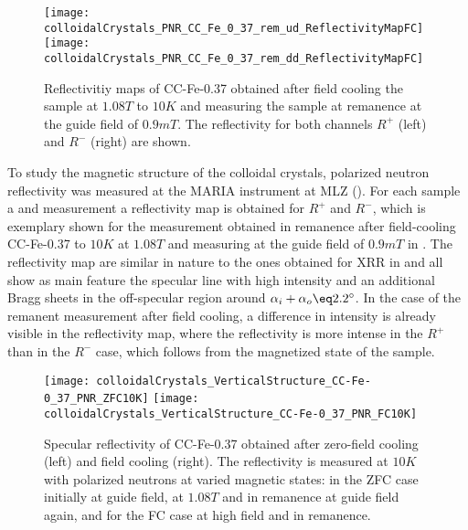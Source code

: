\documentclass[\main/dresen_thesis.tex]{subfiles}
\begin{document}
  \label{sec:colloidalCrystals:layers:pnr}

  \begin{figure}[tb]
    \centering
    \texttt{[image: colloidalCrystals\_PNR\_CC\_Fe\_0\_37\_rem\_ud\_ReflectivityMapFC]}
    \texttt{[image: colloidalCrystals\_PNR\_CC\_Fe\_0\_37\_rem\_dd\_ReflectivityMapFC]}
    \caption{\label{fig:colloidalCrystals:pnrRemanenceMaps} Reflectivitiy maps of CC-Fe-0.37 obtained after field cooling the sample at $1.08 \unit{T}$ to $10 \unit{K}$ and measuring the sample at remanence at the guide field of $0.9 \unit{mT}$. The reflectivity for both channels $R^{+}$ (left) and $R^{-}$ (right) are shown.}
  \end{figure}

  To study the magnetic structure of the colloidal crystals, polarized neutron reflectivity was measured at the MARIA instrument at MLZ ().
  For each sample a and measurement a reflectivity map is obtained for $R^{+}$ and $R^{-}$, which is exemplary shown for the measurement obtained in remanence after field-cooling CC-Fe-0.37 to $10 \unit{K}$ at $1.08\unit{T}$ and measuring at the guide field of $0.9 \unit{mT}$ in .
  The reflectivity map are similar in nature to the ones obtained for XRR in  and all show as main feature the specular line with high intensity and an additional Bragg sheets in the off-specular region around $\alpha_i + \alpha_o \eq 2.2^\circ$.
  In the case of the remanent measurement after field cooling, a difference in intensity is already visible in the reflectivity map, where the reflectivity is more intense in the $R^{+}$ than in the $R^{-}$ case, which follows from the magnetized state of the sample.

  \begin{figure}[tb]
    \centering
    \texttt{[image: colloidalCrystals\_VerticalStructure\_CC-Fe-0\_37\_PNR\_ZFC10K]}
    \texttt{[image: colloidalCrystals\_VerticalStructure\_CC-Fe-0\_37\_PNR\_FC10K]}
    \caption{\label{fig:colloidalCrystals:pnrCCFe37}Specular reflectivity of CC-Fe-0.37 obtained after zero-field cooling (left) and field cooling (right). The reflectivity is measured at $10 \unit{K}$ with polarized neutrons at varied magnetic states: in the ZFC case initially at guide field, at $1.08 \unit{T}$ and in remanence at guide field again, and for the FC case at high field and in remanence.}
  \end{figure}
\end{document}
